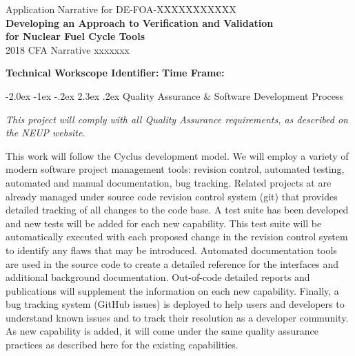 \documentclass[dvips,12pt]{article}
\makeatletter
\renewcommand\section{\@startsection {section}{1}{\z@}%
                                   {-2.0ex \@plus -1ex \@minus -.2ex}%
                                   {2.3ex \@plus.2ex}%
                                   {\normalfont\bfseries}}%
\makeatother
\begin{document}
\begin{centering} Application Narrative for
  DE-FOA-XXXXXXXXXXX\\
  \textbf{\large Developing an Approach to Verification and Validation\\ for Nuclear Fuel Cycle Tools}\\
  2018 CFA Narrative xxxxxxx\\
\end{centering}

\vspace{1em}

\noindent\textbf{Technical Workscope Identifier:}  \hspace{1.5in}
\textbf{Time Frame:}










\section{Quality Assurance \& Software Development Process}

\textit{This project will comply with all Quality Assurance requirements, as
described on the NEUP website.}

This work will follow the Cyclus development model.  We will employ a variety of
modern software project management tools: revision control, automated testing,
automated and manual documentation, bug tracking. Related projects at are
already managed under source code revision control system (git) that provides
detailed tracking of all changes to the code base. A test suite has been
developed and new tests will be added for each new capability. This test suite
will be automatically executed with each proposed change in the revision control
system to identify any flaws that may be introduced. Automated documentation
tools are used in the source code to create a detailed reference for the
interfaces and additional background documentation. Out-of-code detailed reports
and publications will supplement the information on each new capability.
Finally, a bug tracking system (GitHub issues) is deployed to help users and
developers to understand known issues and to track their resolution as a
developer community. As new capability is added, it will come under the same
quality assurance practices as described here for the existing capabilities.







\label{LastPage} 
\end{document}
